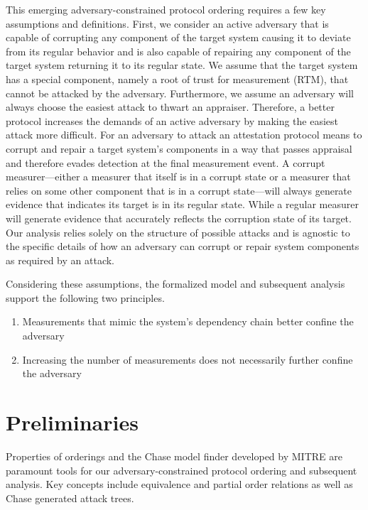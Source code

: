 \documentclass[runningheads]{llncs}
\theoremstyle{definition}
\begin{document}
This emerging adversary-constrained protocol ordering requires a few key assumptions and definitions. First, we consider an active adversary that is capable of corrupting any component of the target system causing it to deviate from its regular behavior and is also capable of repairing any component of the target system returning it to its regular state. We assume that the target system has a special component, namely a root of trust for measurement (RTM), that cannot be attacked by the adversary. Furthermore, we assume an adversary will always choose the easiest attack to thwart an appraiser. Therefore, a better protocol increases the demands of an active adversary by making the easiest attack more difficult. For an adversary to attack an attestation protocol means to corrupt and repair a target system's components in a way that passes appraisal and therefore evades detection at the final measurement event. A corrupt measurer---either a measurer that itself is in a corrupt state or a measurer that relies on some other component that is in a corrupt state---will always generate evidence that indicates its target is in its regular state. While a regular measurer will generate evidence that accurately reflects the corruption state of its target. Our analysis relies solely on the structure of possible attacks and is agnostic to the specific details of how an adversary can corrupt or repair system components as required by an attack.

Considering these assumptions, the formalized model and subsequent analysis support the following two principles.

\begin{enumerate}
    \item Measurements that mimic the system's dependency chain better confine the adversary
    \item Increasing the number of measurements does not necessarily further confine the adversary 
\end{enumerate}



\section{Preliminaries}

Properties of orderings and the Chase model finder developed by MITRE \cite{Ramsdell:2020:Chase} are paramount tools for our adversary-constrained protocol ordering and subsequent analysis. Key concepts include equivalence and partial order relations as well as Chase generated attack trees. 
\end{document}
